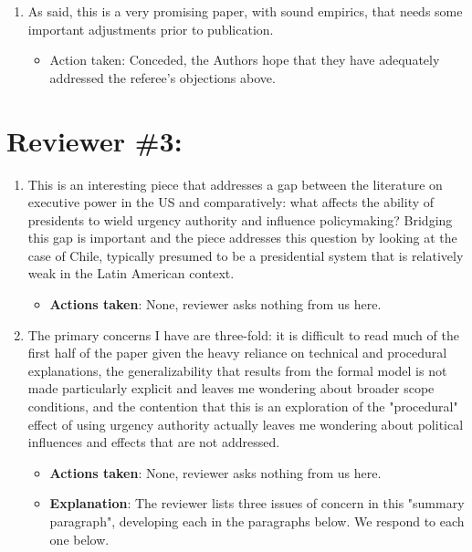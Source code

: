 \documentclass[article,letterpaper,times,12pt,listings-bw,microtype]{article}
\begin{document}
\begin{enumerate}
\begin{itemize}
\end{itemize}
\item As said, this is a very promising paper, with sound empirics, that needs some important adjustments prior to publication.
\label{sec:org3839cf6}
\begin{itemize}
\item Action taken: Conceded, the Authors hope that they have adequately addressed the referee's objections above.
\end{itemize}
\end{enumerate}
\section{Reviewer \#3:}
\label{sec:orgdbcc5ca}
\begin{enumerate}
\item This is an interesting piece that addresses a gap between the literature on executive power in the US and comparatively: what affects the ability of presidents to wield urgency authority and influence policymaking? Bridging this gap is important and the piece addresses this question by looking at the case of Chile, typically presumed to be a presidential system that is relatively weak in the Latin American context.
\label{sec:org7ef3b06}
\begin{itemize}
\item \textbf{Actions taken}: None, reviewer asks nothing from us here.
\end{itemize}
\item The primary concerns I have are three-fold: it is difficult to read much of the first half of the paper given the heavy reliance on technical and procedural explanations, the generalizability that results from the formal model is not made particularly explicit and leaves me wondering about broader scope conditions, and the contention that this is an exploration of the "procedural" effect of using urgency authority actually leaves me wondering about political influences and effects that are not addressed.
\label{sec:org4cfb701}
\begin{itemize}
\item \textbf{Actions taken}: None, reviewer asks nothing from us here.
\item \textbf{Explanation}: The reviewer lists three issues of concern in this "summary paragraph", developing each in the paragraphs below. We respond to each one below.
\end{itemize}

\end{enumerate}
\end{document}
